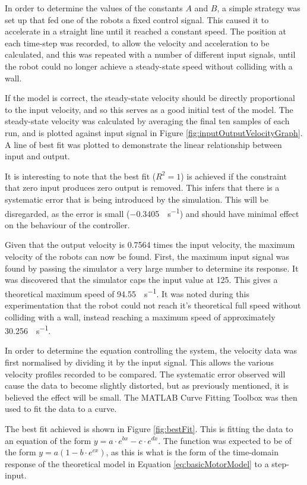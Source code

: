 \documentclass[10pt]{article}
\begin{document}
In order to determine the values of the constants $A$ and $B$, a simple strategy
was set up that fed one of the robots a fixed control signal.  This caused it to
accelerate in a straight line until it reached a constant speed.  The position
at each time-step was recorded, to allow the velocity and acceleration to be
calculated, and this was repeated with a number of different input signals,
until the robot could no longer achieve a steady-state speed without colliding
with a wall.

If the model is correct, the steady-state velocity should be directly
proportional to the input velocity, and so this serves as a good initial test of
the model. The steady-state velocity was calculated by averaging the final ten
samples of each run, and is plotted against input signal in Figure
\ref{fig:inputOutputVelocityGraph}.  A line of best fit was plotted to
demonstrate the linear relationship between input and output.

It is interesting to note that the best fit ($R^2 = 1$) is achieved if the
constraint that zero input produces zero output is removed.  This infers that
there is a systematic error that is being introduced by the simulation.  This
will be disregarded, as the error is small (\SI{-0.3405}{\inch\per\second}) and
should have minimal effect on the behaviour of the controller.

Given that the output velocity is 0.7564 times the input velocity, the maximum
velocity of the robots can now be found. First, the maximum input signal was
found by passing the simulator a very large number to determine its response. It
was discovered that the simulator caps the input value at 125. This gives a
theoretical maximum speed of \SI{94.55}{\inch\per\second}.   It was noted during
this experimentation that the robot could not reach it's theoretical full speed
without colliding with a wall, instead reaching a maximum speed of approximately
\SI{30.256}{\inch\per\second}.

In order to determine the equation controlling the system, the velocity data was
first normalised by dividing it by the input signal.  This allows the various
velocity profiles recorded to be compared.  The systematic error observed will
cause the data to become slightly distorted, but as previously mentioned, it is
believed the effect will be small.  The MATLAB Curve Fitting Toolbox was then
used to fit the data to a curve.

The best fit achieved is shown in Figure \ref{fig:bestFit}.  This is fitting the
data to an equation of the form $y = a \cdot e^{bx} - c \cdot e^{dx} $.  The
function was expected to be of the form $y = a(1-b \cdot e^{cx})$, as this is
what is the form of the time-domain response of the theoretical model in
Equation \ref{eq:basicMotorModel} to a step-input.
\end{document}
